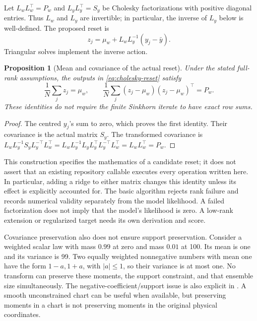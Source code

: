 \documentclass[11pt,a4paper]{article}
\newtheorem{proposition}{Proposition}[section]
\begin{document}
Let \(L_wL_w^\top=P_w\) and \(L_yL_y^\top=S_y\) be Cholesky factorizations
with positive diagonal entries. Thus \(L_w\) and \(L_y\) are invertible;
in particular, the inverse of \(L_y\) below is well-defined.
The proposed reset is
\begin{equation}
\label{eq:cholesky-reset}
 z_j=\mu_w+L_wL_y^{-1}(y_j-\bar y).
\end{equation}
Triangular solves implement the inverse action.

\begin{proposition}[Mean and covariance of the actual reset]
Under the stated full-rank assumptions, the outputs in
\eqref{eq:cholesky-reset} satisfy
\begin{equation}
\label{eq:reset-covariance}
 \frac1N\sum_jz_j=\mu_w,\qquad
 \frac1N\sum_j(z_j-\mu_w)(z_j-\mu_w)^\top=P_w .
\end{equation}
These identities do not require the finite Sinkhorn iterate to have exact
row sums.
\end{proposition}
\begin{proof}
The centred \(y_j\)'s sum to zero, which proves the first identity.
Their covariance is the actual matrix \(S_y\). The transformed covariance is
\(L_wL_y^{-1}S_yL_y^{-\top}L_w^\top
 =L_wL_y^{-1}L_yL_y^\top L_y^{-\top}L_w^\top
 =L_wL_w^\top=P_w\).
\end{proof}

This construction specifies the mathematics of a candidate reset; it does
not assert that an existing repository callable executes every operation
written here. In particular, adding a ridge to either matrix changes this
identity unless its effect is explicitly accounted for. The basic algorithm
rejects rank failure and records numerical validity separately from the
model likelihood. A failed factorization does not imply that the model's
likelihood is zero. A low-rank extension or regularized target needs its own
derivation and score.

Covariance preservation also does not ensure support preservation.
Consider a weighted scalar law with mass \(0.99\) at zero and mass \(0.01\)
at 100. Its mean is one and its variance is 99. Two equally weighted
nonnegative numbers with mean one have the form \(1-a,1+a\), with
\(|a|\leq1\), so their variance is at most one. No transform can preserve
these moments, the support constraint, and that ensemble size simultaneously.
The negative-coefficient/support issue is also explicit in
\citet[Section 7.3]{acevedo2017}. A smooth unconstrained chart can be useful
when available, but preserving moments in a chart is not preserving moments
in the original physical coordinates.
\end{document}
